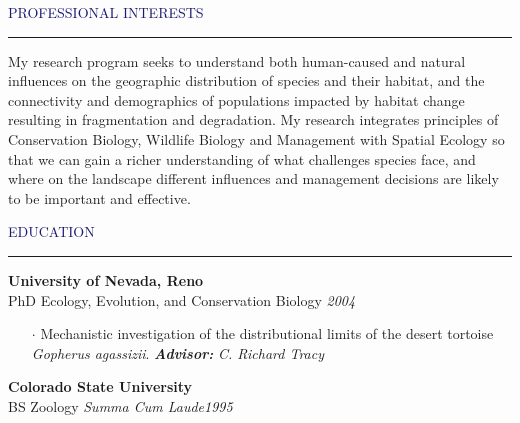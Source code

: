 \documentclass{resume} %
\renewenvironment{rSection}[1]{
\sectionskip
\textcolor{MidnightBlue}{\MakeUppercase{#1}}
\sectionlineskip
\hrule
\begin{list}{}{
\setlength{\leftmargin}{1.5em}
}
\item[]
}{
\end{list}
}
\begin{document}
\begin{rSection}{Professional Interests}
My research program seeks to understand both human-caused and natural influences on the geographic distribution of species and their habitat, and the connectivity and demographics of populations impacted by habitat change resulting in fragmentation and degradation. My research integrates principles of Conservation Biology, Wildlife Biology and Management with Spatial Ecology so that we can gain a richer understanding of what challenges species face, and where on the landscape different influences and management decisions are likely to be important and effective. 
\end{rSection}


\begin{rSection}{Education}

{\bf University of Nevada, Reno} \hfill
\\ PhD Ecology, Evolution, and Conservation Biology \hfill {\em 2004} 
\begin{itemize}
\item[$\cdot$] \textbf{} Mechanistic investigation of the distributional limits of the desert tortoise \textit{Gopherus agassizii}. \textbf{\textit{Advisor:}} \textit{C. Richard Tracy} \hfill
\end{itemize}
{\bf Colorado State University} \hfill
\\ BS Zoology \textit{Summa Cum Laude}\hfill {\em 1995} 
\end{rSection}
\end{document}
